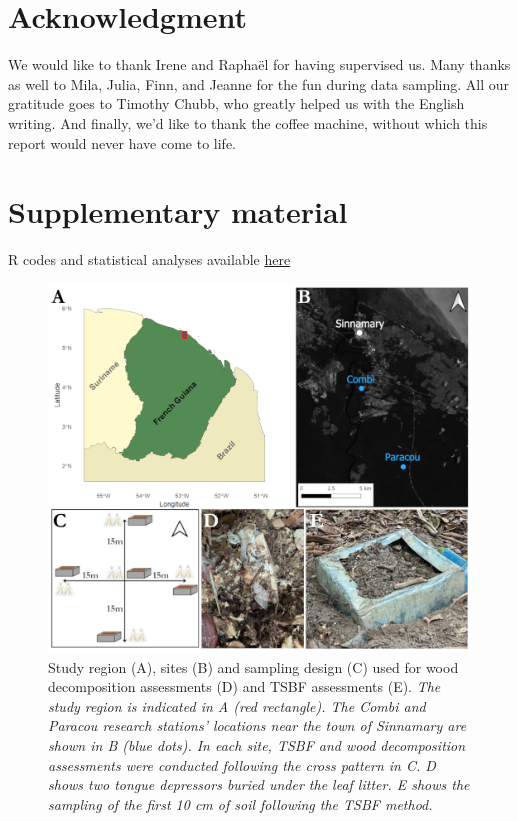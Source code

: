 \documentclass[fleqn,10pt]{ArtEcoFoG} %
\begin{document}
\section{Acknowledgment}\label{acknowledgment}

We would like to thank Irene and Raphaël for having supervised us. Many thanks as well to Mila, Julia, Finn, and Jeanne for the fun during data sampling. All our gratitude goes to Timothy Chubb, who greatly helped us with the English writing. And finally, we'd like to thank the coffee machine, without which this report would never have come to life.

\newpage

\section{Supplementary material}\label{supplementary-material}

R codes and statistical analyses available \href{https://github.com/Pie-Froment/soil_project/tree/main/rapport}{here}

\setcounter{table}{0} \setcounter{figure}{0} \renewcommand{\thefigure}{S\arabic{figure}}

\scriptsize

\begin{figure}

{\centering \includegraphics[width=0.8\linewidth,]{images/methodmaps} 

}

\caption{Study region (A), sites (B) and sampling design (C) used for wood decomposition assessments (D) and TSBF assessments (E). \textit{The study region is indicated in A (red rectangle). The Combi and Paracou research stations' locations near the town of Sinnamary are shown in B (blue dots). In each site, TSBF and wood decomposition assessments were conducted following the cross pattern in C. D shows two tongue depressors buried under the leaf litter. E shows the sampling of the first 10 cm of soil following the TSBF method.}}\label{fig:method}
\end{figure}
\end{document}
